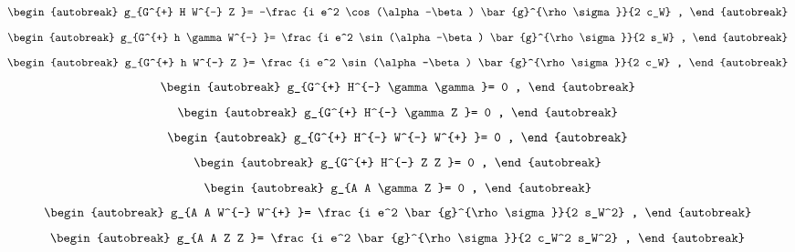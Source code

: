 \begin{align}
\begin{autobreak}
g_{G^{+} H W^{-} Z }=
	-\frac{i e^2 \cos (\alpha -\beta ) \bar{g}^{\rho \sigma }}{2 c_W}
	,
\end{autobreak}
\end{align}
\begin{align}
\begin{autobreak}
g_{G^{+} h \gamma W^{-} }=
	\frac{i e^2 \sin (\alpha -\beta ) \bar{g}^{\rho \sigma }}{2 s_W}
	,
\end{autobreak}
\end{align}
\begin{align}
\begin{autobreak}
g_{G^{+} h W^{-} Z }=
	\frac{i e^2 \sin (\alpha -\beta ) \bar{g}^{\rho \sigma }}{2 c_W}
	,
\end{autobreak}
\end{align}
\begin{align}
\begin{autobreak}
g_{G^{+} H^{-} \gamma \gamma }=
	0
	,
\end{autobreak}
\end{align}
\begin{align}
\begin{autobreak}
g_{G^{+} H^{-} \gamma Z }=
	0
	,
\end{autobreak}
\end{align}
\begin{align}
\begin{autobreak}
g_{G^{+} H^{-} W^{-} W^{+} }=
	0
	,
\end{autobreak}
\end{align}
\begin{align}
\begin{autobreak}
g_{G^{+} H^{-} Z Z }=
	0
	,
\end{autobreak}
\end{align}
\begin{align}
\begin{autobreak}
g_{A A \gamma Z }=
	0
	,
\end{autobreak}
\end{align}
\begin{align}
\begin{autobreak}
g_{A A W^{-} W^{+} }=
	\frac{i e^2 \bar{g}^{\rho \sigma }}{2 s_W^2}
	,
\end{autobreak}
\end{align}
\begin{align}
\begin{autobreak}
g_{A A Z Z }=
	\frac{i e^2 \bar{g}^{\rho \sigma }}{2 c_W^2 s_W^2}
	,
\end{autobreak}
\end{align}
